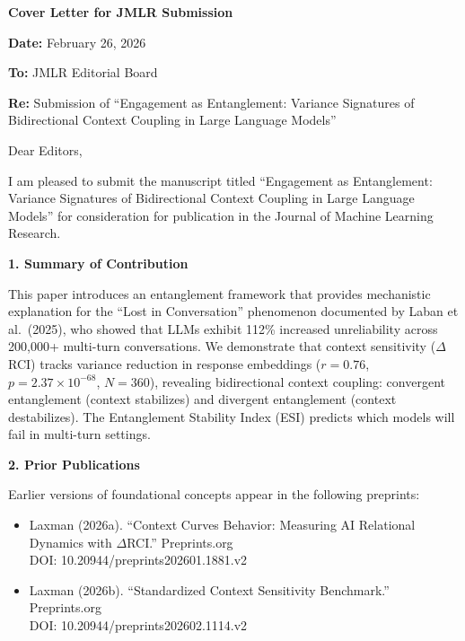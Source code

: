 \documentclass[11pt]{article}
\begin{document}
\begin{center}
\textbf{\Large Cover Letter for JMLR Submission}
\end{center}

\vspace{1em}

\noindent \textbf{Date:} February 26, 2026

\vspace{1em}

\noindent \textbf{To:} JMLR Editorial Board

\vspace{1em}

\noindent \textbf{Re:} Submission of ``Engagement as Entanglement: Variance Signatures of Bidirectional Context Coupling in Large Language Models''

\vspace{1em}

\noindent Dear Editors,

\vspace{0.5em}

I am pleased to submit the manuscript titled ``Engagement as Entanglement: Variance Signatures of Bidirectional Context Coupling in Large Language Models'' for consideration for publication in the Journal of Machine Learning Research.

\vspace{1em}

\noindent \textbf{1. Summary of Contribution}

This paper introduces an entanglement framework that provides mechanistic explanation for the ``Lost in Conversation'' phenomenon documented by Laban et al.\ (2025), who showed that LLMs exhibit 112\% increased unreliability across 200,000+ multi-turn conversations. We demonstrate that context sensitivity ($\Delta$RCI) tracks variance reduction in response embeddings ($r = 0.76$, $p = 2.37 \times 10^{-68}$, $N = 360$), revealing bidirectional context coupling: convergent entanglement (context stabilizes) and divergent entanglement (context destabilizes). The Entanglement Stability Index (ESI) predicts which models will fail in multi-turn settings.

\vspace{1em}

\noindent \textbf{2. Prior Publications}

Earlier versions of foundational concepts appear in the following preprints:
\begin{itemize}
    \item Laxman (2026a). ``Context Curves Behavior: Measuring AI Relational Dynamics with $\Delta$RCI.'' Preprints.org\\
    DOI: 10.20944/preprints202601.1881.v2
    \item Laxman (2026b). ``Standardized Context Sensitivity Benchmark.'' Preprints.org\\
    DOI: 10.20944/preprints202602.1114.v2
\end{itemize}
\end{document}
